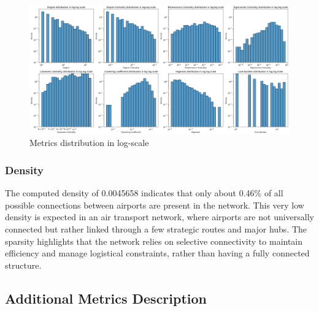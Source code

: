 \documentclass[12pt]{article}
\begin{document}
\begin{figure}[H]
    \centering
    \includegraphics[width=0.8\linewidth]{img/metrics_logscale_output.png}
    \caption{Metrics distribution in log-scale}
\end{figure}

\subsubsection{Density}
The computed density of 0.0045658 indicates that only about 0.46\% of all possible connections between airports are present in the network. This very low density is expected in an air transport network, where airports are not universally connected but rather linked through a few strategic routes and major hubs. The sparsity highlights that the network relies on selective connectivity to maintain efficiency and manage logistical constraints, rather than having a fully connected structure.

\subsection{Additional Metrics Description}
\end{document}
